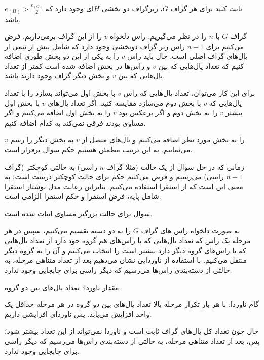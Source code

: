 \documentclass[11pt,largemargins]{h2wp}
\begin{document}
 \question
  
    ثابت کنید برای هر گراف $G$، زیرگراف دو بخشی $H$ای وجود دارد که 
     $e_{(H)} > \frac{e_{(G)}}{2}$
     باشد. 
    
  
  \solution 
   
   گراف $G$ با $ n$ را در نظر می‌گیریم. راس دلخواه $v$ را از این گراف برمی‌داریم. فرض می‌کنیم برای $n-1 $ راس زیر گراف دوبخشی وجود دارد که شامل بیش از نیمی از یال‌های گراف اصلی است. حال باید راس  $v$ را به یکی از این دو بخش طوری اضافه کنیم که تعداد یال‌هایی که بین $v$ و راس‌ها در بخش اضافه شده است کمتر از تعداد یال‌هایی که بین $v$ و بخش دیگر گراف وجود دارند باشد.
   
   برای این کار می‌توان، تعداد یال‌هایی که راس $v$ با بخش اول می‌تواند بسازد را با تعداد یال‌هایی که $v$ با بخش دوم می‌سازد مقایسه کنید. اگر تعداد یال‌های $v$  با بخش اول بیشتر $v$ را به بخش دوم و اگر برعکس بود $v$ را به بخش اول اضافه می‌کنیم و اگر مساوی بودند فرقی نمی‌کند به کدام اضافه کنیم.
   
   $v$ 
   را به بخش مورد نظر اضافه می‌کنیم و یال‌های متصل از $v$ به بخش دیگر را رسم می‌نماییم. به این ترتیب مطمئن هستیم حکم سوال برقرار است.
   
  \notes
  
  زمانی که در حل سوال از یک حالت (مثلا گراف $ n$ راسی) به حالتی کوچکتر (گراف $n-1 $ راسی) می‌رسیم و فرض می‌کنیم حکم برای حالت کوچکتر درست است؛ به معنی این است که از استقرا استفاده می‌کنیم. بنابراین رعایت مدل نوشتار استقرا شامل پایه، فرض استقرا و حکم استقرا الزامی است.
    
   
 سوال برای حالت بزرگتر مساوی اثبات شده است.
 
 
    
   به صورت دلخواه راس های گراف $G$ را به دو دسته تقسیم می‌کنیم، سپس در هر مرحله یک راس که تعداد یال‌هایی که با راس‌های هم گروه خود دارد از تعداد یال‌هایی که با راس‌های گروه دیگر دارد بیشتر است را انتخاب می‌کنیم و آن را به گروه دیگر منتقل می‌کنیم. با استفاده از ناوردایی نشان می‌دهیم بعد از تعداد متناهی مرحله، به حالتی از دسته‌بندی راس‌ها می‌رسیم که دیگر راسی برای جابجایی وجود ندارد.
   
   مقدار ناوردا: تعداد یال‌های بین دو گروه.
   
   گام ناوردا: با هر بار تکرار مرحله بالا تعداد یال‌های بین دو گروه در هر مرحله حداقل یک واحد افزایش می‌یابد. پس ناوردای افزایشی داریم.
   
     حال چون تعداد کل یال‌های گراف ثابت است و ناوردا نمی‌تواند از این تعداد بیشتر شود؛ پس، بعد از تعداد متناهی مرحله، به حالتی از دسته‌بندی راس‌ها می‌رسیم که دیگر راسی برای جابجایی وجود ندارد. 
     
\end{document}
